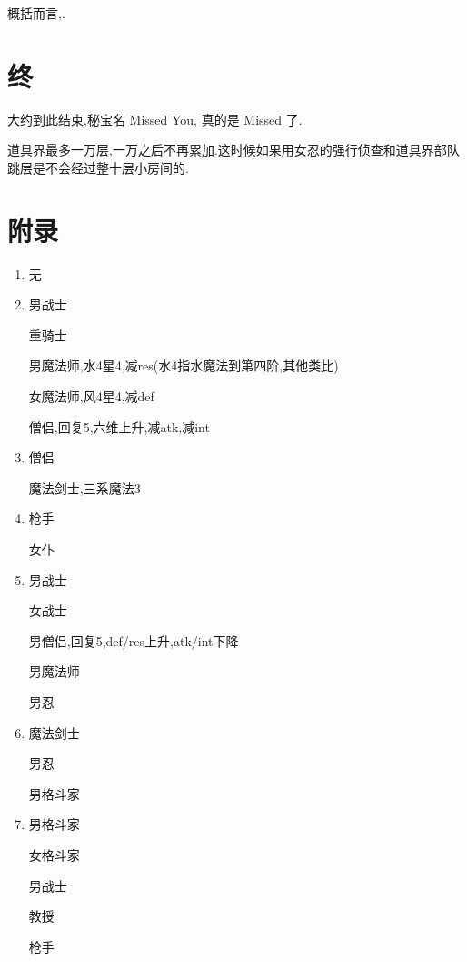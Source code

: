 	概括而言,{\color{red}{二十星是利用连击+部队总攻击}}.


	\newpage
	\section{终}

	大约到此结束,秘宝名 Missed You, 真的是 Missed 了.

	道具界最多一万层,一万之后不再累加.这时候如果用女忍的强行侦查和道具界部队跳层是不会经过整十层小房间的.

	\newpage
	\section*{附录}

	\begin{enumerate}\label{sec:泛用捕获列表}
		\item
		无
		\item
		男战士

		重骑士

		男魔法师,水4星4,减res(水4指水魔法到第四阶,其他类比)

		女魔法师,风4星4,减def

		僧侣,回复5,六维上升,减atk,减int

		\item
		{\color{red}{男忍,减hit,减spd,五系异常(毒眠麻忘魅)}}

		僧侣

		魔法剑士,三系魔法3
		
		\item
		枪手

		女仆

		{\color{red}{教授,星4,攻击属性上升(atk,int,hit,spd)}}

		\item
		男战士

		女战士

		男僧侣,回复5,def/res上升,atk/int下降

		男魔法师

		男忍

		\item
		魔法剑士

		男忍

		男格斗家

		\item
		男格斗家

		女格斗家

		男战士

		教授

		枪手


\end{enumerate}

